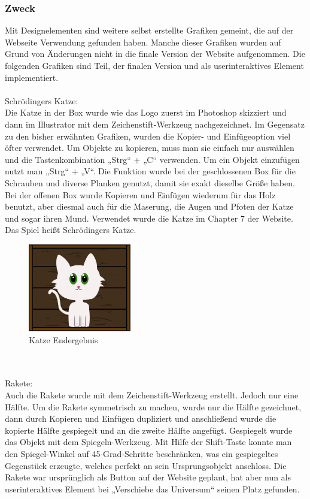 \subsubsection{Zweck}
Mit Designelementen sind weitere selbst erstellte Grafiken gemeint, die auf der Webseite Verwendung gefunden haben. Manche dieser Grafiken wurden auf Grund von Änderungen nicht in die finale Version der Website aufgenommen. Die folgenden Grafiken sind Teil, der finalen Version und als userinteraktives Element implementiert.
\leavevmode \\
\leavevmode \\
Schrödingers Katze:
\leavevmode \\
Die Katze in der Box wurde wie das Logo zuerst im Photoshop skizziert und dann im Illustrator mit dem Zeichenstift-Werkzeug nachgezeichnet. Im Gegensatz zu den bisher erwähnten Grafiken, wurden die Kopier- und Einfügeoption viel öfter verwendet. Um Objekte zu kopieren, muss man sie einfach nur auswählen und die Tastenkombination „Strg“ + „C“ verwenden. Um ein Objekt einzufügen nutzt man „Strg“ + „V“. Die Funktion wurde bei der geschlossenen Box für die Schrauben und diverse Planken genutzt, damit sie exakt dieselbe Größe haben. Bei der offenen Box wurde Kopieren und Einfügen wiederum für das Holz benutzt, aber diesmal auch für die Maserung, die Augen und Pfoten der Katze und sogar ihren Mund. Verwendet wurde die Katze im Chapter 7 der Website. Das Spiel heißt Schrödingers Katze.\cite{cap}

\begin{figure}[H] 
  \centering
     \includegraphics[width=0.4\textwidth]{design_abb8.png}
  \caption{Katze Endergebnis}
\end{figure}

\leavevmode \\
\leavevmode \\
Rakete: 
\leavevmode \\
Auch die Rakete wurde mit dem Zeichenstift-Werkzeug erstellt. Jedoch nur eine Hälfte. Um die Rakete symmetrisch zu machen, wurde nur die Hälfte gezeichnet, dann durch Kopieren und Einfügen dupliziert und anschließend wurde die kopierte Hälfte gespiegelt und an die zweite Hälfte angefügt. Gespiegelt wurde das Objekt mit dem Spiegeln-Werkzeug. Mit Hilfe der Shift-Taste konnte man den Spiegel-Winkel auf 45-Grad-Schritte beschränken, was ein gespiegeltes Gegenstück erzeugte, welches perfekt an sein Ursprungsobjekt anschloss. Die Rakete war ursprünglich als Button auf der Website geplant, hat aber nun als userinteraktives Element bei „Verschiebe das Universum“ seinen Platz gefunden.\cite{spiegel}


